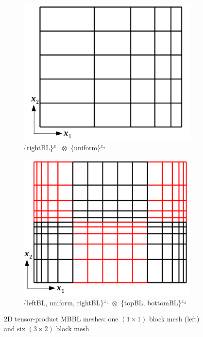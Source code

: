 \documentclass[a4paper,12pt]{article}
\begin{document}
\begin{figure}[H]
	\centering
	\begin{subfigure}[b]{0.45\textwidth}
		\centering
		\includegraphics[scale=0.45]{figures/MBBL2D_eg1.png}
		\caption{\tiny\{rightBL\}$^{x_1}\,\,\otimes\,\,$\{uniform\}$^{x_2}$}
	\end{subfigure}
	\hspace{1cm}
	\begin{subfigure}[b]{0.45\textwidth}
		\centering
		\includegraphics[scale=0.45]{figures/MBBL2D_eg2.png}
		\caption{\tiny\{leftBL, uniform, rightBL\}$^{x_1}\,\,\otimes\,\,$\{topBL, bottomBL\}$^{x_2}$}
	\end{subfigure}
	\caption{2D tensor-product MBBL meshes: one $(1\times1)$ block mesh  (left) and six $(3\times2)$ block mesh }
	\label{fig:MBBL_2D_eg}
\end{figure}
\end{document}
